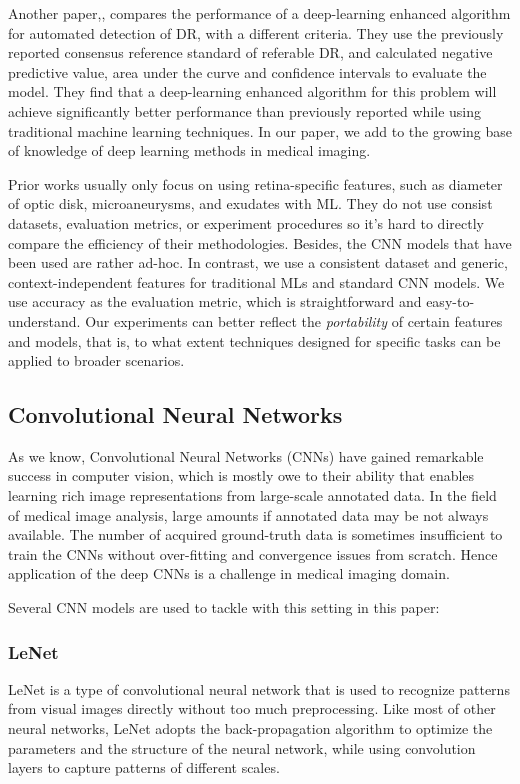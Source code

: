 Another paper,\cite{5}, compares the performance of a deep-learning enhanced algorithm for automated detection of DR, with a different criteria. They use the previously reported consensus reference standard of referable DR, and calculated negative predictive value, area under the curve and confidence intervals to evaluate the model. They find that a deep-learning enhanced algorithm for this problem will achieve significantly better performance than previously reported while using traditional machine learning techniques. In our paper, we add to the growing base of knowledge of deep learning methods in medical imaging.


Prior works usually only focus on using retina-specific features, such as diameter of optic disk, microaneurysms, and exudates with ML. They do not use consist datasets, evaluation metrics, or 
experiment procedures so it's hard to directly compare the efficiency of their methodologies. Besides, 
the CNN models that have been used are rather ad-hoc. In contrast, we use a consistent dataset and generic, context-independent features for traditional MLs and standard CNN models. We use accuracy as the evaluation metric, which is straightforward and easy-to-understand. Our experiments can better reflect the \emph{portability} of certain features and models, that is, to what extent techniques designed for specific tasks can be applied to broader scenarios. 

\subsection{Convolutional Neural Networks}

As we know, Convolutional Neural Networks (CNNs) have gained remarkable success in computer vision, which is mostly owe to their ability that enables learning rich image representations from large-scale annotated data. In the field of medical image analysis, large amounts if annotated data may be not always available. The number of acquired ground-truth data is sometimes insufficient to train the CNNs without over-fitting and convergence issues from scratch. Hence application of the deep CNNs is a challenge in medical imaging domain.

Several CNN models are used to tackle with this setting in this paper: 

\subsubsection{LeNet}
LeNet is a type of convolutional neural network that is used to recognize patterns from visual images directly without too much preprocessing. Like most of other neural networks, LeNet adopts the back-propagation algorithm to optimize the parameters and the structure of the neural network, while using convolution layers to capture patterns of different scales\cite{LeNet}.

